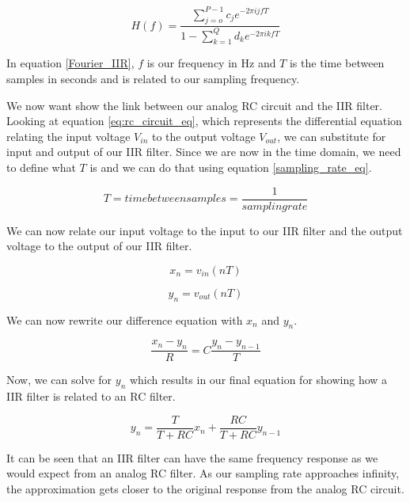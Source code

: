 \begin{equation}\label{Fourier_IIR}
H(f)=\frac{\displaystyle\sum\limits_{j=o}^{P-1} c_je^{-2\pi ijfT}}{1-\displaystyle\sum\limits_{k=1}^{Q} d_ke^{-2\pi ikfT}}
\end{equation}

In equation \ref{Fourier_IIR}, $f$ is our frequency in Hz and $T$ is the time between samples in seconds and is related to our sampling frequency.

We now want show the link between our analog RC circuit and the IIR filter.  Looking at equation \ref{eq:rc_circuit_eq}, which represents the differential equation relating the input voltage $V_{in}$ to the output voltage $V_{out}$, we can substitute for input and output of our IIR filter.  Since we are now in the time domain, we need to define what $T$ is and we can do that using equation \ref{sampling_rate_eq}.

\begin{equation}\label{sampling_rate_eq}
T=time between samples=\frac{1}{sampling rate}
\end{equation}

We can now relate our input voltage to the input to our IIR filter and the output voltage to the output of our IIR filter.

\begin{equation}\label{input_IIR}
x_n=v_{in}(nT)
\end{equation}

\begin{equation}\label{output_IIR}
y_n=v_{out}(nT)
\end{equation}

We can now rewrite our difference equation with $x_n$ and $y_n$.

\begin{equation}\label{diff_xn_yn}
\frac{x_n-y_n}{R}=C\frac{y_n-y_{n-1}}{T}
\end{equation}

Now, we can solve for $y_n$ which results in our final equation for showing how a IIR filter is related to an RC filter.

\begin{equation}\label{final_IIR_RC}
y_n=\frac{T}{T+RC}x_n+\frac{RC}{T+RC}y_{n-1}
\end{equation}

It can be seen that an IIR filter can have the same frequency response as we would expect from an analog RC filter.  As our sampling rate approaches infinity, the approximation gets closer to the original response from the analog RC circuit.  

